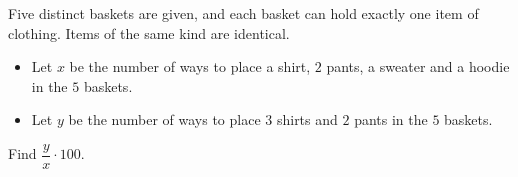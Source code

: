 Five distinct baskets are given, and each basket can hold exactly one item of clothing. Items of the same kind are identical.
\begin{itemize}
\item Let $x$ be the number of ways to place a shirt, $2$ pants, a sweater and a hoodie in the $5$ baskets.
\item Let $y$ be the number of ways to place $3$ shirts and $2$ pants in the $5$ baskets.
\end{itemize}
Find $\dfrac{y}{x}\cdot100$.

